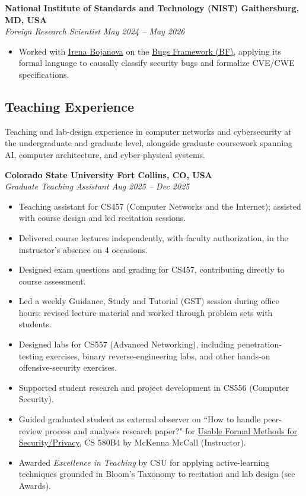 \documentclass[11pt, a4paper]{article}
\begin{document}
\medskip
{\fontsize{10.87}{13.5}\selectfont
\textbf{\color{cvred} National Institute of Standards and Technology (NIST) \hfill Gaithersburg, MD, USA}\\
\textit{Foreign Research Scientist \hfill May 2024 -- May 2026}

\begin{itemize}[leftmargin=*, itemsep=2pt, topsep=2pt]
  \item Worked with \href{https://www.nist.gov/people/irena-bojanova}{Irena Bojanova} on the \href{https://www.nist.gov/itl/ssd/software-quality-group/samate/bugs-framework-bf}{Bugs Framework (BF)}, applying its formal language to causally classify security bugs and formalize CVE/CWE specifications.
\end{itemize}
}

\subsection{\color{cvred} Teaching Experience}

{\fontsize{10.87}{13.5}\selectfont
Teaching and lab-design experience in computer networks and cybersecurity at the undergraduate and graduate level, alongside graduate coursework spanning AI, computer architecture, and cyber-physical systems.
}

\medskip
{\fontsize{10.87}{13.5}\selectfont
\textbf{\color{cvred} Colorado State University \hfill Fort Collins, CO, USA}\\
\textit{Graduate Teaching Assistant \hfill Aug 2025 -- Dec 2025}

\begin{itemize}[leftmargin=*, itemsep=2pt, topsep=2pt]
  \item Teaching assistant for CS457 (Computer Networks and the Internet); assisted with course design and led recitation sessions.
  \item Delivered course lectures independently, with faculty authorization, in the instructor's absence on 4 occasions.
  \item Designed exam questions and grading for CS457, contributing directly to course assessment.
  \item Led a weekly Guidance, Study and Tutorial (GST) session during office hours: revised lecture material and worked through problem sets with students.
  \item Designed labs for CS557 (Advanced Networking), including penetration-testing exercises, binary reverse-engineering labs, and other hands-on offensive-security exercises.
  \item Supported student research and project development in CS556 (Computer Security).
  \item Guided graduated student as external observer on ``How to handle peer-review process and analyses research paper?" for \href{https://courses.cs.colostate.edu/cs580b4/}{Usable Formal Methods for Security/Privacy}, CS 580B4 by McKenna McCall (Instructor).
  \item Awarded \textit{Excellence in Teaching} by CSU for applying active-learning techniques grounded in Bloom's Taxonomy to recitation and lab design (see Awards).
\end{itemize}
}
\end{document}
